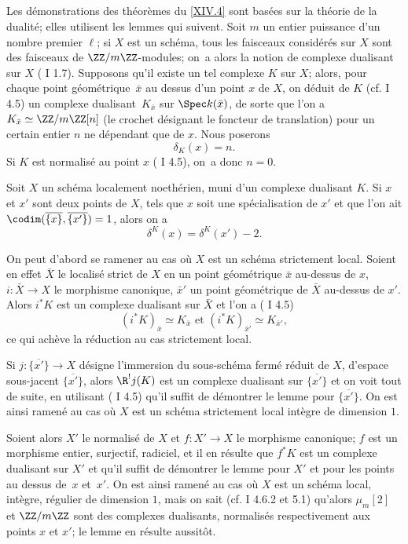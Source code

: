 \subsection{} \label{XIV.2.3}
Les d\'emonstrations des th\'eor\`emes du \numero \ref{XIV.4} sont bas\'ees sur la th\'eorie de la dualit\'e; elles utilisent les lemmes qui suivent. Soit $m$ un entier puissance d'un nombre premier $\ell$; si $X$ est un sch\'ema, tous les faisceaux consid\'er\'es sur $X$ sont des faisceaux de $\ZZ/m\ZZ$-modules; on~a alors la notion de complexe dualisant sur $X$ ( I 1.7). Supposons qu'il existe un tel complexe $K$ sur $X$; alors, pour chaque point g\'eom\'etrique~$\bar x$ au dessus d'un point $x$ de $X$, on d\'eduit de $K$ (cf.  I 4.5) un complexe dualisant~$K_{\bar x}$ sur $\Spec k(\bar x)$, de sorte que l'on a $K_{\bar x}\simeq\ZZ/m\ZZ[n]$ (le crochet d\'esignant le foncteur de translation) pour un certain entier $n$ ne d\'ependant que de $x$. Nous poserons
$$
\delta_K(x)=n.
$$
Si $K$ est normalis\'e au point $x$ ( I 4.5), on~a donc $n=0$.

\begin{sublemme} \label{XIV.2.3.1} Soit $X$ un sch\'ema localement noeth\'erien, muni d'un complexe dualisant $K$. Si $x$ et $x'$ sont deux points de $X$, tels que $x$ soit une sp\'ecialisation de $x'$ et que l'on ait $\codim(\overline{\{x\}}, \overline{\{x'\}})=1$, alors on a
$$
\delta^K(x)=\delta^{K}(x')-2.
$$
\end{sublemme}

On peut d'abord se ramener au cas o\`u $X$ est un sch\'ema strictement local. Soient en effet $\bar X$ le localis\'e strict de $X$ en un point g\'eom\'etrique $\bar x$ au-dessus de $x$, $i:\bar X\to X$ le morphisme canonique, $\bar x'$ un point g\'eom\'etrique de $\bar X$ au-dessus de $x'$. Alors $i^*K$ est un complexe dualisant sur $\bar X$ et l'on a ( I 4.5)
$$
(i^*K)_{\bar x}\simeq K_{\bar x}\text{ et } (i^*K)_{\bar x'}\simeq K_{\bar x'},
$$
ce qui ach\`eve la r\'eduction au cas strictement local.

Si $j:\overline{\{x'\}}\to X$ d\'esigne l'immersion du sous-sch\'ema ferm\'e r\'eduit de $X$, d'espace sous-jacent $\overline{\{x'\}}$, alors $\R^!j(K)$ est un complexe dualisant sur $\overline{\{x'\}}$ et on voit tout de suite, en utilisant ( I 4.5) qu'il suffit de d\'emontrer le lemme pour $\overline{\{x'\}}$. On est ainsi ramen\'e au cas o\`u $X$ est un sch\'ema strictement local int\`egre de dimension $1$.

Soient alors $X'$ le normalis\'e de $X$ et $f:X'\to X$ le morphisme canonique; $f$ est un morphisme entier, surjectif, radiciel, et il en r\'esulte que $f^*K$ est un complexe dualisant sur $X'$ et qu'il suffit de d\'emontrer le lemme pour $X'$ et pour les points au dessus de~$x$ et~$x'$. On est ainsi ramen\'e au cas o\`u $X$ est un sch\'ema local, int\`egre, r\'egulier de dimension $1$, mais on sait (cf.  I 4.6.2 et 5.1) qu'alors $\mu_m[2]$ et $\ZZ/m\ZZ$ sont des complexes dualisants, normalis\'es respectivement aux points $x$ et $x'$; le lemme en r\'esulte aussit\^{o}t.


